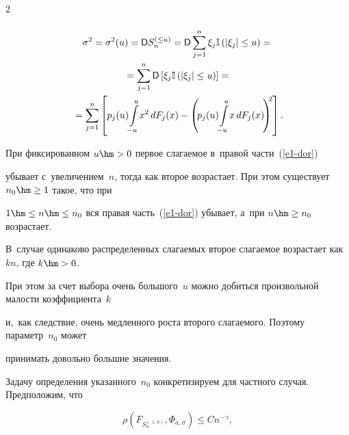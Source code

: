 \begin{multicols}{2}
\begin{multline*}
\end{multline*}






\noindent

\begin{multline*}

\sigma^2=\sigma^2(u)={\sf D}S_n^{(\le u)}={\sf D}\sum\limits_{j=1}^n 

\xi_j\mathbb{I}\left(\left\vert \xi_j\right\vert \le u\right)={}\\

{}=

\sum\limits_{j=1}^n {\sf D}\left[\xi_j\mathbb{I}\left(\left\vert \xi_j\right\vert \le u\right)\right]=

{}\\

{}=\sum\limits_{j=1}^n\left[p_j(u)\!\int\limits_{-u}^{u}\!x^2\,dF_j(x)-

\left(\! p_j(u)\!\int\limits_{-u}^{u}\!x\,dF_j(x)\!

\right)^{\!\!2\,}\!\right].

\end{multline*}



При фиксированном $u\hm>0$ первое слагаемое в~правой части~(\ref{e1-dor}) 

убывает с~увеличением~$n$, тогда как второе возрастает. При этом существует $n_0\hm\ge1$ такое, что при

 $1\hm\le n\hm\le n_0$ вся правая часть~(\ref{e1-dor}) убывает, а~при $n\hm\ge n_0$ воз\-рас\-та\-ет. 

 В~случае одинаково распределенных слагаемых второе слагаемое воз\-рас\-та\-ет как~$kn$, где $k\hm>0$. 

 При этом за счет выбора очень большого~$u$ можно добиться произвольной малости коэффициента~$k$ 

 и,~как следствие, очень медленного роста второго слагаемого. Поэтому параметр~$n_0$ может 

 принимать довольно большие значения.



Задачу определения указанного~$n_0$ конкретизируем для частного случая. Предположим, что

\begin{equation}

\rho\left(F_{S_n^{(\le u)}},\Phi_{a,\sigma}\right)\le C n^{-\gamma}, \label{e9-dor}


\end{equation}
\end{multicols}
